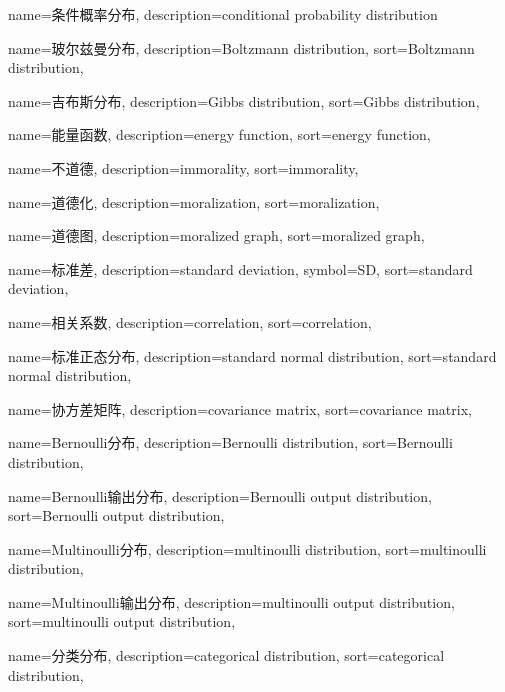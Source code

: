 {
  name=条件概率分布,
  description={conditional probability distribution}
}

{
  name=玻尔兹曼分布,
  description={Boltzmann distribution},
  sort={Boltzmann distribution},
}

{
  name=吉布斯分布,
  description={Gibbs distribution},
  sort={Gibbs distribution},
}

{
  name=能量函数,
  description={energy function},
  sort={energy function},
}

{
  name=不道德,
  description={immorality},
  sort={immorality},
}

{
  name=道德化,
  description={moralization},
  sort={moralization},
}

{
  name=道德图,
  description={moralized graph},
  sort={moralized graph},
}

{
  name=标准差,
  description={standard deviation},
  symbol={SD},
  sort={standard deviation},
}

{
  name=相关系数,
  description={correlation},
  sort={correlation},
}

{
  name=标准正态分布,
  description={standard normal distribution},
  sort={standard normal distribution},
}

{
  name=协方差矩阵,
  description={covariance matrix},
  sort={covariance matrix},
}

{
  name=Bernoulli分布,
  description={Bernoulli distribution},
  sort={Bernoulli distribution},
}

{
  name=Bernoulli输出分布,
  description={Bernoulli output distribution},
  sort={Bernoulli output distribution},
}

{
  name=Multinoulli分布,
  description={multinoulli distribution},
  sort={multinoulli distribution},
}

{
  name=Multinoulli输出分布,
  description={multinoulli output distribution},
  sort={multinoulli output distribution},
}

{
  name=分类分布,
  description={categorical distribution},
  sort={categorical distribution},
}

